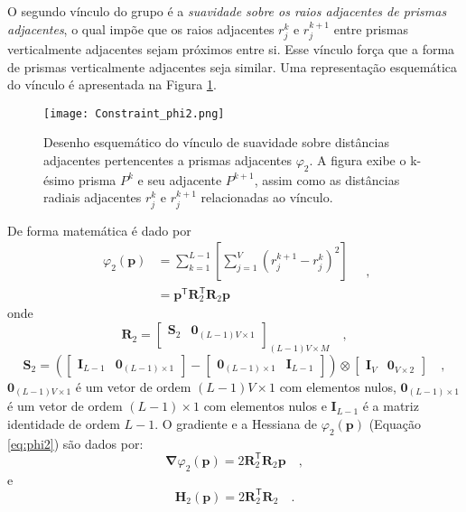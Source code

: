O segundo vínculo do grupo é a \textit{suavidade sobre os raios adjacentes de prismas adjacentes}, o qual impõe que os raios adjacentes $r_{j}^{k}$ e $r_{j}^{k+1}$ entre prismas verticalmente adjacentes sejam próximos entre si. Esse vínculo força que a forma de prismas verticalmente adjacentes seja similar. Uma representação esquemática do vínculo é apresentada na Figura \ref{fig:phi2}.

\begin{figure}[!htb]
	\centering
	\texttt{[image: Constraint\_phi2.png]}
	\caption{Desenho esquemático do vínculo de suavidade sobre distâncias adjacentes pertencentes a prismas adjacentes $\varphi_{2}$. A figura exibe o k-ésimo prisma $P^k$ e seu adjacente $P^{k+1}$, assim como as distâncias radiais adjacentes $r_j^k$ e $r_j^{k+1}$ relacionadas ao vínculo.}
	\label{fig:phi2}
\end{figure}

De forma matemática é dado por
\begin{equation}\label{eq:phi2}
\begin{split}
\varphi_{2}(\mathbf{p}) &= \sum\limits^{L-1}_{k=1}\left[\sum\limits^{V}_{j=1}\left(r^{k+1}_{j}-r^{k}_{j}\right)^2\right] \\
&= \mathbf{p}^{\mathsf{T}} \mathbf{R}^{\mathsf{T}}_{2}\mathbf{R}_{2}\mathbf{p}
\end{split} \quad ,
\end{equation}
onde
\begin{equation}
\mathbf{R}_{2} = 
\begin{bmatrix}
\mathbf{S}_{2} & \mathbf{0}_{(L-1)V \times 1} \\
\end{bmatrix}_{(L-1)V \times M} \quad ,
\label{eq:R2-matrix}
\end{equation}
\begin{equation}
\mathbf{S}_{2} =
\left( 
\begin{bmatrix} \mathbf{I}_{L-1} & \mathbf{0}_{(L-1) \times 1} \end{bmatrix} -
\begin{bmatrix} \mathbf{0}_{(L-1) \times 1} & \mathbf{I}_{L-1} \end{bmatrix} 
\right) \otimes 
\begin{bmatrix} \mathbf{I}_{V} & \mathbf{0}_{V \times 2} \end{bmatrix} \quad ,
\label{eq:S2-matrix}
\end{equation}
$\mathbf{0}_{(L-1)V \times 1}$ é um vetor de ordem $(L-1)V \times 1$ com elementos nulos,
$\mathbf{0}_{(L-1) \times 1}$ é um vetor de ordem $(L-1) \times 1$ com elementos nulos e 
$\mathbf{I}_{L-1}$ é a matriz identidade de ordem $L-1$. O gradiente e a Hessiana de $\varphi_{2}(\mathbf{p})$ (Equação \ref{eq:phi2}) são dados por:
\begin{equation}\label{eq:phi2_grad}
\boldsymbol{\nabla}\varphi_{2}(\mathbf{p}) = 2\mathbf{R}^\mathsf{T}_{2}\mathbf{R}_{2}\mathbf{p} \quad ,
\end{equation}
e
\begin{equation}\label{eq:phi2_hessian}
\mathbf{H}_{2}(\mathbf{p}) = 2\mathbf{R}^\mathsf{T}_{2}\mathbf{R}_{2} \quad .
\end{equation}

